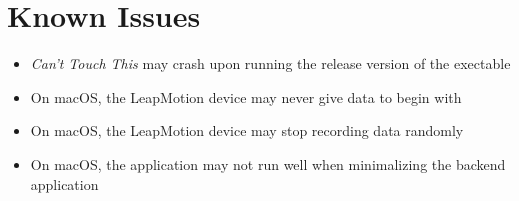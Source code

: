 \documentclass[a4paper]{article}
\providecommand{\tightlist}{%
\setlength{\itemsep}{0pt}\setlength{\parskip}{0pt}}
\begin{document}


  \section{Known Issues}
  \begin{itemize}
    \tightlist
    \item \textit{Can't Touch This} may crash upon running the release version
      of the exectable
    \item On macOS, the LeapMotion device may never give data to begin with
    \item On macOS, the LeapMotion device may stop recording data randomly
    \item On macOS, the application may not run well when minimalizing the
      backend application
  \end{itemize}
\end{document}
